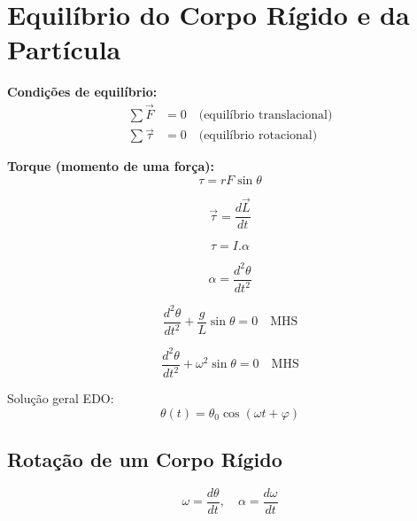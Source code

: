 \documentclass[a4paper,12pt]{article}
\begin{document}
\section*{Equilíbrio do Corpo Rígido e da Partícula}

\textbf{Condições de equilíbrio:}
\begin{align*}
  \sum \vec{F} &= 0 \quad \text{(equilíbrio translacional)} \\
  \sum \vec{\tau} &= 0 \quad \text{(equilíbrio rotacional)}
\end{align*}

\textbf{Torque (momento de uma força):}
\begin{equation*}
  \tau = r F \sin \theta
\end{equation*}

\begin{equation*}
  \vec{\tau} = \frac{d\vec{L}}{dt}
\end{equation*}

\begin{equation*}
  \tau = I.\alpha
\end{equation*}

\begin{equation*}
  \alpha = \frac{d^{2}\theta}{dt^{2}}
\end{equation*}

\begin{equation*}
  \frac{d^{2}\theta}{dt^{2}} + \frac{g}{L}\sin\theta = 0 \quad \textrm{MHS}
\end{equation*}

\begin{equation*}
  \frac{d^{2}\theta}{dt^{2}} + \omega^{2}\sin\theta = 0 \quad \textrm{MHS}
\end{equation*}

Solução geral EDO:
\begin{equation*}
  \theta(t) = \theta_{0} \cos(\omega t + \varphi)
\end{equation*}

\subsection*{Rota\c{c}\~ao de um Corpo R\'igido}
\begin{equation*}
  \omega = \frac{d\theta}{dt}, \quad \alpha = \frac{d\omega}{dt}
\end{equation*}
\end{document}
